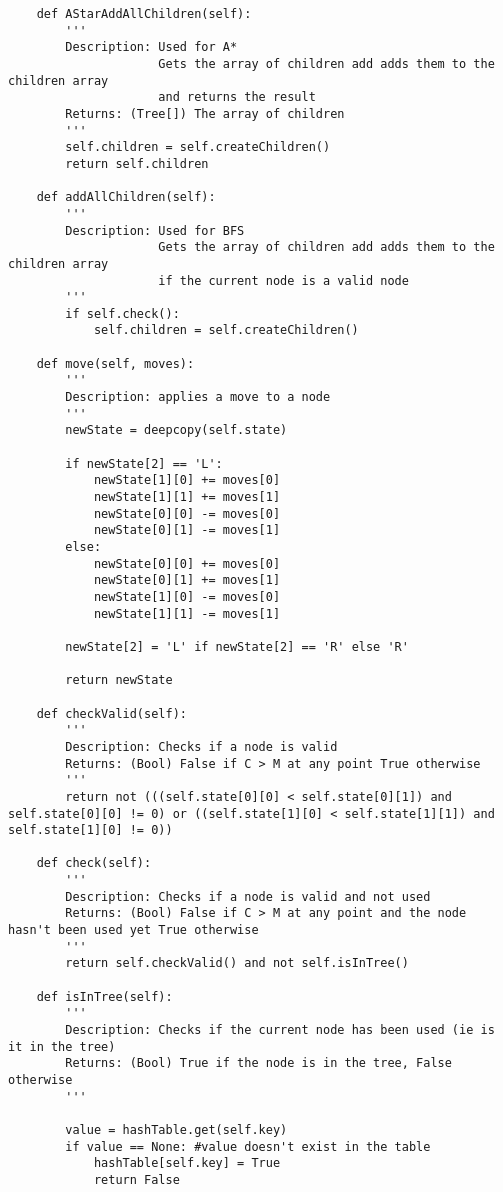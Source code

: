 \documentclass{article}
\begin{document}
\begin{verbatim}
    def AStarAddAllChildren(self):
        '''
        Description: Used for A*
                     Gets the array of children add adds them to the children array
                     and returns the result
        Returns: (Tree[]) The array of children
        '''
        self.children = self.createChildren()
        return self.children

    def addAllChildren(self):
        '''
        Description: Used for BFS
                     Gets the array of children add adds them to the children array
                     if the current node is a valid node
        '''
        if self.check():
            self.children = self.createChildren()

    def move(self, moves):
        '''
        Description: applies a move to a node
        '''
        newState = deepcopy(self.state)

        if newState[2] == 'L':
            newState[1][0] += moves[0]
            newState[1][1] += moves[1]
            newState[0][0] -= moves[0]
            newState[0][1] -= moves[1]
        else:
            newState[0][0] += moves[0]
            newState[0][1] += moves[1]
            newState[1][0] -= moves[0]
            newState[1][1] -= moves[1]

        newState[2] = 'L' if newState[2] == 'R' else 'R'

        return newState

    def checkValid(self):
        '''
        Description: Checks if a node is valid
        Returns: (Bool) False if C > M at any point True otherwise
        '''
        return not (((self.state[0][0] < self.state[0][1]) and self.state[0][0] != 0) or ((self.state[1][0] < self.state[1][1]) and self.state[1][0] != 0))

    def check(self):
        '''
        Description: Checks if a node is valid and not used
        Returns: (Bool) False if C > M at any point and the node hasn't been used yet True otherwise
        '''
        return self.checkValid() and not self.isInTree()

    def isInTree(self):
        '''
        Description: Checks if the current node has been used (ie is it in the tree)
        Returns: (Bool) True if the node is in the tree, False otherwise
        '''

        value = hashTable.get(self.key)
        if value == None: #value doesn't exist in the table
            hashTable[self.key] = True
            return False


\end{verbatim}
\end{document}
